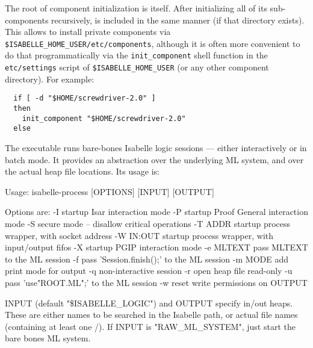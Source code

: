 \begin{isabellebody}
\begin{isamarkuptext}
  The root of component initialization is \hyperlink{setting.ISABELLE-HOME}{\mbox{}}
  itself.  After initializing all of its sub-components recursively,
  \hyperlink{setting.ISABELLE-HOME-USER}{\mbox{}} is included in the same manner (if
  that directory exists).  This allows to install private components
  via \verb|$ISABELLE_HOME_USER/etc/components|, although it is
  often more convenient to do that programmatically via the
  \verb,init_component, shell function in the \verb,etc/settings,
  script of \verb,$ISABELLE_HOME_USER, (or any other component
  directory).  For example:
  \begin{verbatim}
  if [ -d "$HOME/screwdriver-2.0" ]
  then
    init_component "$HOME/screwdriver-2.0"
  else
  \end{verbatim}%
\end{isamarkuptext}%
\isamarkuptrue%
%
\isamarkuptrue%
%
\begin{isamarkuptext}%
The \hypertarget{executable.isabelle-process}{\hyperlink{executable.isabelle-process}{\mbox{}}} executable runs bare-bones
  Isabelle logic sessions --- either interactively or in batch mode.
  It provides an abstraction over the underlying ML system, and over
  the actual heap file locations.  Its usage is:

\begin{ttbox}
Usage: isabelle-process [OPTIONS] [INPUT] [OUTPUT]

  Options are:
    -I           startup Isar interaction mode
    -P           startup Proof General interaction mode
    -S           secure mode -- disallow critical operations
    -T ADDR      startup process wrapper, with socket address
    -W IN:OUT    startup process wrapper, with input/output fifos
    -X           startup PGIP interaction mode
    -e MLTEXT    pass MLTEXT to the ML session
    -f           pass 'Session.finish();' to the ML session
    -m MODE      add print mode for output
    -q           non-interactive session
    -r           open heap file read-only
    -u           pass 'use"ROOT.ML";' to the ML session
    -w           reset write permissions on OUTPUT

  INPUT (default "\$ISABELLE_LOGIC") and OUTPUT specify in/out heaps.
  These are either names to be searched in the Isabelle path, or
  actual file names (containing at least one /).
  If INPUT is "RAW_ML_SYSTEM", just start the bare bones ML system.
\end{ttbox}


\end{isamarkuptext}
\end{isabellebody}
